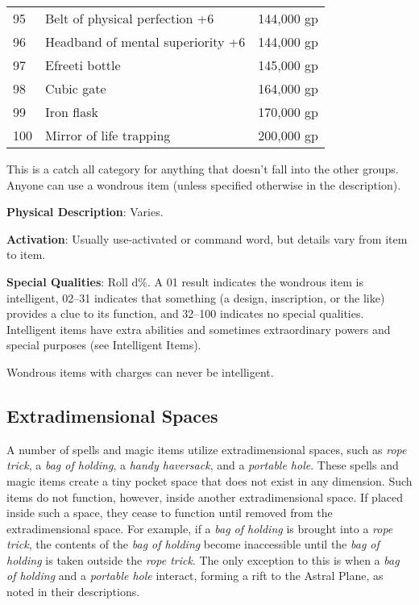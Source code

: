 \begin{xtabular}{lll}
95  & Belt of physical perfection +6                 & 144,000 gp   \\
96  & Headband of mental superiority +6              & 144,000 gp   \\
97  & Efreeti bottle                                 & 145,000 gp   \\
98  & Cubic gate                                     & 164,000 gp   \\
99  & Iron flask                                     & 170,000 gp   \\
100 & Mirror of life trapping                        & 200,000 gp  
\end{xtabular}

\label{f0}				
This is a catch all category for anything that doesn't fall into the other groups. Anyone can use a wondrous item (unless specified otherwise in the description).
				
\textbf{Physical Description}: Varies.
				
\textbf{Activation}: Usually use-activated or command word, but details vary from item to item.
				
\textbf{Special Qualities}: Roll d\%. A 01 result indicates the wondrous item is intelligent, 02--31 indicates that something (a design, inscription, or the like) provides a clue to its function, and 32--100 indicates no special qualities. Intelligent items have extra abilities and sometimes extraordinary powers and special purposes (see Intelligent Items).
				
Wondrous items with charges can never be intelligent.
				
\subsection{Extradimensional Spaces}

			
A number of spells and magic items utilize extradimensional spaces, such as \textit{rope trick}, a \textit{bag of holding}, a \textit{handy haversack}, and a \textit{portable hole}. These spells and magic items create a tiny pocket space that does not exist in any dimension. Such items do not function, however, inside another extradimensional space. If placed inside such a space, they cease to function until removed from the extradimensional space. For example, if a \textit{bag of holding} is brought into a\textit{ rope trick}, the contents of the \textit{bag of holding} become inaccessible until the \textit{bag of holding} is taken outside the \textit{rope trick}. The only exception to this is when a\textit{ bag of holding} and a \textit{portable hole} interact, forming a rift to the Astral Plane, as noted in their descriptions.
				
